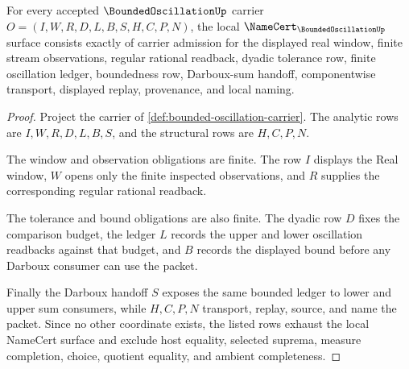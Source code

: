 \begin{theorem}
\label{thm:bounded-oscillation-namecert-obligations}
For every accepted $\BoundedOscillationUp$ carrier $O=(I,W,R,D,L,B,S,H,C,P,N)$, the local $\NameCert_{\BoundedOscillationUp}$ surface consists exactly of carrier admission for the displayed real window, finite stream observations, regular rational readback, dyadic tolerance row, finite oscillation ledger, boundedness row, Darboux-sum handoff, componentwise transport, displayed replay, provenance, and local naming.
\end{theorem}
\begin{proof}
Project the carrier of \autoref{def:bounded-oscillation-carrier}. The analytic rows are $I,W,R,D,L,B,S$, and the structural rows are $H,C,P,N$.

The window and observation obligations are finite. The row $I$ displays the Real window, $W$ opens only the finite inspected observations, and $R$ supplies the corresponding regular rational readback.

The tolerance and bound obligations are also finite. The dyadic row $D$ fixes the comparison budget, the ledger $L$ records the upper and lower oscillation readbacks against that budget, and $B$ records the displayed bound before any Darboux consumer can use the packet.

Finally the Darboux handoff $S$ exposes the same bounded ledger to lower and upper sum consumers, while $H,C,P,N$ transport, replay, source, and name the packet. Since no other coordinate exists, the listed rows exhaust the local NameCert surface and exclude host equality, selected suprema, measure completion, choice, quotient equality, and ambient completeness.
\end{proof}

